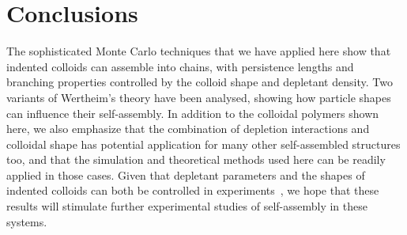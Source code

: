 \documentclass[8.5pt,oneside,onecolumn]{article}
\begin{document}
\section{Conclusions} \label{sec:conclusions}

The sophisticated Monte Carlo techniques that we have applied here
show that indented colloids can assemble into chains, with persistence
lengths and branching properties controlled by the colloid shape
and depletant density.  Two variants of Wertheim's theory have been analysed, showing
how particle shapes can influence their self-assembly.  
In addition to the colloidal polymers shown here, we also emphasize that the combination
of depletion interactions and colloidal shape has potential application for many other self-assembled
structures too, and that the simulation and theoretical methods used here can be readily applied in those cases.
Given that depletant parameters and the shapes of indented colloids can both be controlled in 
experiments~\cite{Sacanna:2010ys,Sacanna2011,sacanna13,Bahadur2012,Rossi11,Alsayed04,Savage09}, we hope that these results will
stimulate further experimental studies of self-assembly in these systems.






\end{document}
